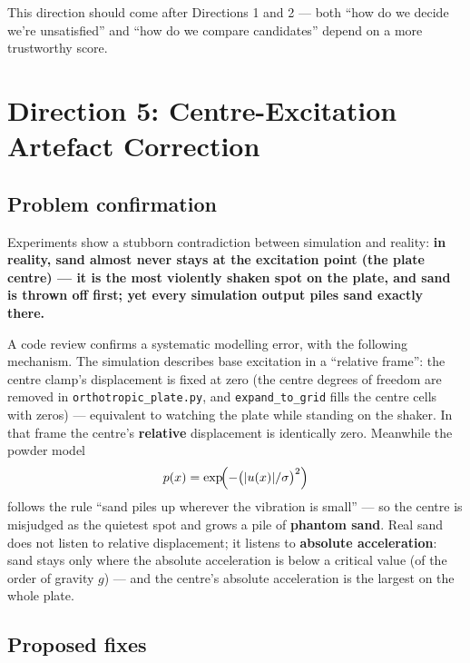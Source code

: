 \documentclass[11pt,a4paper]{article}
\newcommand{\code}[1]{\texttt{#1}}
\begin{document}
This direction should come after Directions 1 and 2 --- both ``how do we decide we're unsatisfied'' and ``how do we compare candidates'' depend on a more trustworthy score.

\section{Direction 5: Centre-Excitation Artefact Correction}

\subsection{Problem confirmation}

Experiments show a stubborn contradiction between simulation and reality: \textbf{in reality, sand almost never stays at the excitation point (the plate centre) --- it is the most violently shaken spot on the plate, and sand is thrown off first; yet every simulation output piles sand exactly there.}

A code review confirms a systematic modelling error, with the following mechanism. The simulation describes base excitation in a ``relative frame'': the centre clamp's displacement is fixed at zero (the centre degrees of freedom are removed in \code{orthotropic\_plate.py}, and \code{expand\_to\_grid} fills the centre cells with zeros) --- equivalent to watching the plate while standing on the shaker. In that frame the centre's \textbf{relative} displacement is identically zero. Meanwhile the powder model
\begin{equation}
p(x) = \exp\!\Bigl(-\bigl(|u(x)|/\sigma\bigr)^2\Bigr)
\end{equation}
follows the rule ``sand piles up wherever the vibration is small'' --- so the centre is misjudged as the quietest spot and grows a pile of \textbf{phantom sand}. Real sand does not listen to relative displacement; it listens to \textbf{absolute acceleration}: sand stays only where the absolute acceleration is below a critical value (of the order of gravity $g$) --- and the centre's absolute acceleration is the largest on the whole plate.

\subsection{Proposed fixes}
\end{document}
